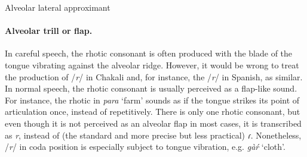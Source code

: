 \begin{table}[!htb]
\small
\centering
\caption{Alveolar lateral approximant\label{tab:alveolar-lateral-approximant}}
\quad
{}
\end{table}


\paragraph{Alveolar trill or flap.}
\label{sec:flap}

 In careful speech,  the rhotic consonant is often produced with the blade 
of the tongue
vibrating against the alveolar ridge. However,
it would be wrong to treat  the production of /{\it r}/ in Chakali  and, for 
instance,
the /{\it r}/ in
Spanish, as similar. In normal speech,  the rhotic consonant is
usually perceived  as a flap-like sound. For instance,  the 
rhotic in {\it para} `farm' sounds as if the tongue strikes its point of
articulation once, instead of repetitively. There is only one rhotic consonant,
but  even though it is not perceived as an alveolar flap in most cases, it is
transcribed as {\it r},  instead of (the standard and more precise but less
practical) {\it ɾ}.  Nonetheless,   /{\it r}/ in coda position is especially 
subject to
tongue vibration, e.g. {\it gàŕ} `cloth'. 

